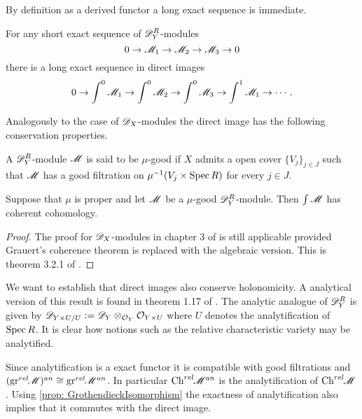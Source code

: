     By definition as a derived functor a long exact sequence is immediate.
    \begin{proposition}
        For any short exact sequence of $\mathscr{D}_Y^R$-modules
        $$0\to \mathscr{M}_1 \to \mathscr{M}_2 \to \mathscr{M}_3 \to 0$$
        there is a long exact sequence in direct images
        $$0\to \int^0 \mathscr{M}_1 \to \int^0 \mathscr{M}_2 \to \int^0 \mathscr{M}_3 \to \int^1 \mathscr{M}_1 \to \cdots. $$
    \end{proposition}
    Analogously to the case of $\mathscr{D}_X$-modules the direct image has the following conservation properties.
  \begin{definition}
      A $\mathscr{D}_Y^R$-module $\mathscr{M}$ is said to be $\mu$-good if $X$ admits a open cover $\{V_j\}_{j\in J}$ such that $\mathscr{M}$ has a good filtration on $\mu^{-1}(V_j\times \operatorname{Spec} R)$ for every $j\in J$.
  \end{definition}
  \begin{theorem}
      Suppose that $\mu$ is proper and let $\mathscr{M}$ be a $\mu$-good $\mathscr{D}_Y^R$-module. Then $\int \mathscr{M}$ has coherent cohomology.
  \end{theorem}
  \begin{proof}
    The proof for $\mathscr{D}_X$-modules in chapter 3 of \cite{sabbah2011introduction} is still applicable provided Grauert's coherence theorem is replaced with the algebraic version. This is theorem 3.2.1 of \cite{EGAIII}.
  \end{proof}
  We want to establish that direct images also conserve holonomicity.
  A analytical version of this result is found in theorem 1.17 of \cite{monteiro2016riemann}.
  The analytic analogue of $\mathscr{D}_{Y}^R$ is given by $\mathscr{D}_{Y\times U/U}:= \mathscr{D}_Y\otimes_{\mathcal{O}_Y}\mathcal{O}_{Y\times U}$ where $U$ denotes the analytification of $\operatorname{Spec} R$.
  It is clear how notions such as the relative characteristic variety may be analytified.

  Since analytification is a exact functor it is compatible with good filtrations and $(\operatorname{gr}^{rel}\mkern-5mu\mathscr{M})^{an} \cong \operatorname{gr}^{rel}\mkern-5mu \mathscr{M}^{an}$.
  In particular $\operatorname{Ch}^{rel}\mkern-5mu \mathscr{M}^{an}$ is the analytification of $\operatorname{Ch}^{rel}\mkern-5mu\mathscr{M}$.
  Using \cref{prop: GrothendieckIsomorphism} the exactness of analytification also implies that it commutes with the direct image.


